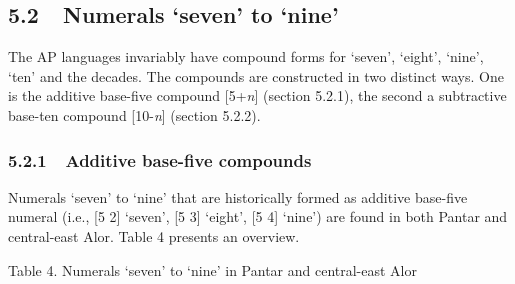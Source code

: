 \subsection[5.2\ \ Numerals {\textquoteleft}seven{\textquoteright} to {\textquoteleft}nine{\textquoteright}]{5.2\ \ Numerals {\textquoteleft}seven{\textquoteright} to {\textquoteleft}nine{\textquoteright}}
The AP languages invariably have compound forms for {\textquoteleft}seven{\textquoteright}, {\textquoteleft}eight{\textquoteright}, {\textquoteleft}nine{\textquoteright}, {\textquoteleft}ten{\textquoteright} and the decades. The compounds are constructed in two distinct ways. One is the additive base-five compound [5+\textit{n}] (section 5.2.1), the second a subtractive base-ten compound [10-\textit{n}] (section 5.2.2). 

\subsubsection[5.2.1\ \ Additive base{}-five compounds ]{5.2.1\ \ Additive base-five compounds }
Numerals {\textquoteleft}seven{\textquoteright} to {\textquoteleft}nine{\textquoteright} that are historically formed as additive base-five numeral (i.e., [5 2] {\textquoteleft}seven{\textquoteright}, [5 3] {\textquoteleft}eight{\textquoteright}, [5 4] {\textquoteleft}nine{\textquoteright}) are found in both Pantar and central-east Alor. Table 4 presents an overview.

{\centering
Table 4. Numerals {\textquoteleft}seven{\textquoteright} to {\textquoteleft}nine{\textquoteright} in Pantar and central-east Alor
\par}

